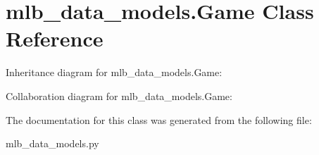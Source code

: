 \hypertarget{classmlb__data__models_1_1Game}{}\section{mlb\+\_\+data\+\_\+models.\+Game Class Reference}
\label{classmlb__data__models_1_1Game}


Inheritance diagram for mlb\+\_\+data\+\_\+models.\+Game\+:


Collaboration diagram for mlb\+\_\+data\+\_\+models.\+Game\+:


The documentation for this class was generated from the following file\+:\begin{DoxyCompactItemize}
\item 
mlb\+\_\+data\+\_\+models.\+py\end{DoxyCompactItemize}
